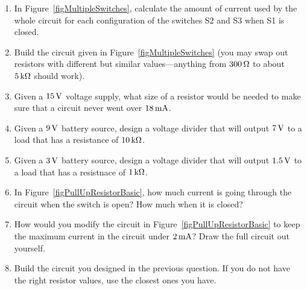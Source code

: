 \applysection

\begin{enumerate}
\item In Figure~\ref{figMultipleSwitches}, calculate the amount of current used by the whole circuit for each configuration of the switches S2 and S3 when S1 is closed.
\item Build the circuit given in Figure~\ref{figMultipleSwitches} (you may swap out resistors with different but similar values---anything from $300\,\si{\ohm}$ to about $5\,\si{\kilo\ohm}$ should work).
\item Given a $15\,\si{\volt}$ voltage supply, what size of a resistor would be needed to make sure that a circuit never went over $18\,\si{\milli\ampere}$.
\item Given a $9\,\si{\volt}$ battery source, design a voltage divider that will output $7\,\si{\volt}$ to a load that has a resistance of $10\,\si{\kilo\ohm}$.
\item Given a $3\,\si{\volt}$ battery source, design a voltage divider that will output $1.5\,\si{\volt}$ to a load that has a resistnace of $1\,\si{\kilo\ohm}$.
\item In Figure~\ref{figPullUpResistorBasic}, how much current is going through the circuit when the switch is open?  How much when it is closed?
\item How would you modify the circuit in Figure~\ref{figPullUpResistorBasic} to keep the maximum current in the circuit under $2\,\si{\milli\ampere}$?  Draw the full circuit out yourself.
\item Build the circuit you designed in the previous question.  If you do not have the right resistor values, use the closest ones you have.
\end{enumerate}
